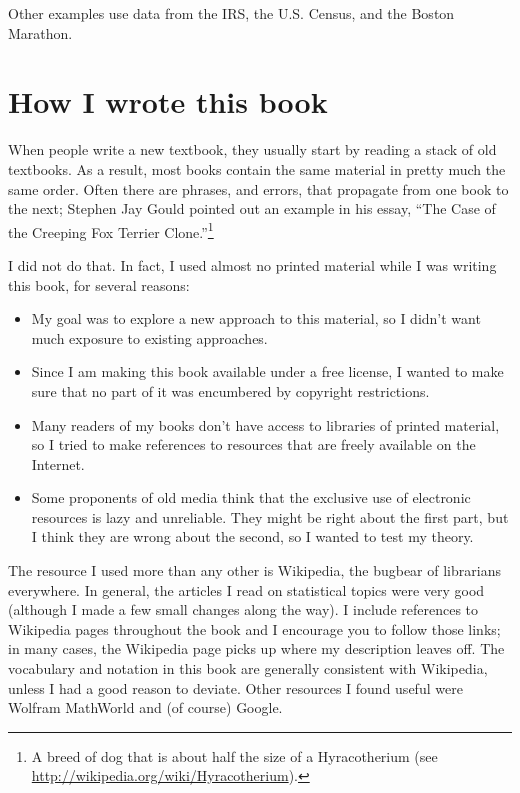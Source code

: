 \documentclass[12pt]{book}
\begin{document}
Other examples use data from the IRS, the U.S. Census, and
the Boston Marathon.


\section*{How I wrote this book}

When people write a new textbook, they usually start by
reading a stack of old textbooks.  As a result, most books
contain the same material in pretty much the same order.  Often there
are phrases, and errors, that propagate from one book to the next;
Stephen Jay Gould pointed out an example in his essay, ``The Case of
the Creeping Fox Terrier Clone.''\footnote{A breed of dog that is about half
  the size of a Hyracotherium (see
  \url{http://wikipedia.org/wiki/Hyracotherium}).}

I did not do that.  In fact, I used almost no printed material while I
was writing this book, for several reasons:

\begin{itemize}

\item My goal was to explore a new approach to this material, so I didn't
want much exposure to existing approaches.

\item Since I am making this book available under a free license, I wanted
to make sure that no part of it was encumbered by copyright restrictions.

\item Many readers of my books don't have access to libraries of
printed material, so I tried to make references to resources that are
freely available on the Internet.

\item Some proponents of old media think that the exclusive
use of electronic resources is lazy and unreliable.  They might be right
about the first part, but I think they are wrong about the second, so
I wanted to test my theory.


\end{itemize}

The resource I used more than any other is Wikipedia, the bugbear
of librarians everywhere.  In general, the articles I read on
statistical topics were very good (although I made a few small changes
along the way).  I include references to Wikipedia pages throughout
the book and I encourage you to follow those links; in many cases, the
Wikipedia page picks up where my description leaves off.  The
vocabulary and notation in this book are generally consistent with
Wikipedia, unless I had a good reason to deviate.
Other resources I found useful were Wolfram MathWorld and (of course)
Google.
\end{document}
